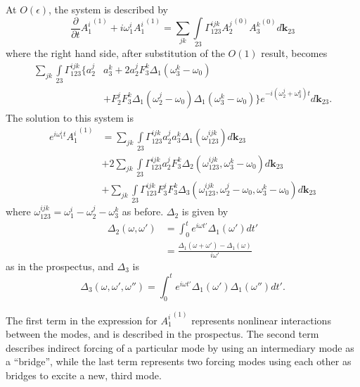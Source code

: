 \documentclass[letterpaper, 11pt]{article}
\newcommand{\pdiff}[2]{\frac{\partial #1}{\partial #2}}
\begin{document}
At $O(\epsilon)$, the system is described by
\begin{equation}
\pdiff{}{t}{A^i_1}^{(1)} + i \omega^i_1 {A^i_1}^{(1)} = \sum_{jk} \int\limits_{23} \Gamma^{ijk}_{123} {A^j_2}^{(0)} {A^k_3}^{(0)} d\mathbf{k}_{23} 
\end{equation}
where the right hand side, after substitution of the $O(1)$ result, becomes
\begin{equation}
\begin{split}
\sum_{jk} \int\limits_{23} \Gamma^{ijk}_{123} \lbrace a^j_2 & a^k_3 + 2 a^j_2 F^k_3 \Delta_1(\omega^k_3 - \omega_0) \\
&+ F^j_2 F^k_3 \Delta_1(\omega^j_2 - \omega_0) \Delta_1(\omega^k_3 - \omega_0) \rbrace e^{-i(\omega^j_2 + \omega^k_3)t} d\mathbf{k}_{23}.
\end{split}
\end{equation}
The solution to this system is
\begin{equation}
\begin{split}
e^{i\omega^i_1 t}{A^i_1}^{(1)} &= \sum_{jk} \int\limits_{23} \Gamma^{ijk}_{123} a^j_2 a^k_3 \Delta_1(\omega^{ijk}_{123}) d\mathbf{k}_{23} \\
&+ 2 \sum_{jk} \int\limits_{23} \Gamma^{ijk}_{123} a^j_2 F^k_3 \Delta_2(\omega^{ijk}_{123},\omega^k_3 - \omega_0) d\mathbf{k}_{23} \\
&+ \sum_{jk} \int\limits_{23} \Gamma^{ijk}_{123} F^j_3 F^k_3 \Delta_3(\omega^{ijk}_{123}, \omega^j_2 - \omega_0, \omega^k_3 - \omega_0) d\mathbf{k}_{23}
\end{split}
\end{equation}
where $\omega^{ijk}_{123} = \omega^i_1 - \omega^j_2 - \omega^k_3$ as before. $\Delta_2$ is given by
\begin{equation}
\begin{split}
\Delta_2(\omega, \omega') &= \int_0^t e^{i \omega t'} \Delta_1(\omega') dt' \\
&= \frac{\Delta_1(\omega + \omega') - \Delta_1(\omega)}{i \omega'}
\end{split}
\end{equation}
as in the prospectus, and $\Delta_3$ is
\begin{equation}
\Delta_3(\omega, \omega', \omega'') = \int_0^t e^{i \omega t'} \Delta_1(\omega') \Delta_1(\omega'') dt'.
\end{equation}

The first term in the expression for ${A^i_1}^{(1)}$ represents nonlinear interactions between the modes, and is described in the prospectus. The second term describes indirect forcing of a particular mode by using an intermediary mode as a ``bridge'', while the last term represents two forcing modes using each other as bridges to excite a new, third mode.
\end{document}
